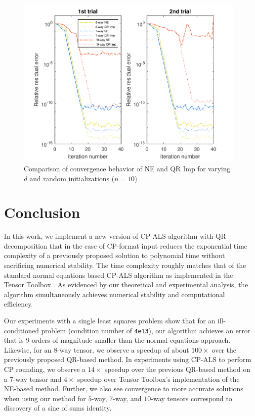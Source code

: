 \documentclass{article}
\begin{document}
\begin{figure}[ht!]
  \begin{center}  
    \includegraphics*[scale = 1.1]{sinsums_acc2.pdf}
    \caption[Figure]{Comparison of convergence behavior of NE and QR Imp for varying $d$ and random initializations ($n=10$) \label{fig:error}}
  \end{center}  
\end{figure}

\section{Conclusion}
\label{sec:conclusion}

In this work, we implement a new version of CP-ALS algorithm with QR decomposition that in the case of CP-format input reduces the exponential time complexity of a previously proposed solution \cite{MVLB23} to polynomial time without sacrificing numerical stability.
The time complexity roughly matches that of the standard normal equations based CP-ALS algorithm as implemented in the Tensor Toolbox \cite{TensorToolbox}.
As evidenced by our theoretical and experimental analysis, the algorithm simultaneously achieves numerical stability and computational efficiency.

Our experiments with a single least squares problem show that for an ill-conditioned problem (condition number of \texttt{4e13}), our algorithm achieves an error that is 9 orders of magnitude smaller than the normal equations approach.
Likewise, for an 8-way tensor, we observe a speedup of about $100\times$ over the previously proposed QR-based method.
In experiments using CP-ALS to perform CP rounding, we observe a $14\times$ speedup over the previous QR-based method on a 7-way tensor and $4\times$ speedup over Tensor Toolbox's implementation of the NE-based method.
Further, we also see convergence to more accurate solutions when using our method for $5$-way, $7$-way, and $10$-way tensors correspond to discovery of a sine of sums identity.
\end{document}
